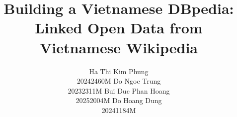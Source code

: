 \newcommand{\fillin}[1]{\textcolor{red}{[#1]}}

\usepackage{tikz}
\usetikzlibrary{arrows.meta, calc, positioning, backgrounds, shapes.geometric}

\usepackage[colorlinks=true, allcolors=blue]{hyperref}

\title{Building a Vietnamese DBpedia:\\ Linked Open Data from Vietnamese Wikipedia}

\author{%
  Ha Thi Kim Phung \\ 20242460M
  \And
  Do Ngoc Trung \\ 20232311M
  \And
  Bui Duc Phan Hoang \\ 20252004M
  \And
  Do Hoang Dung \\ 20241184M
}

\makeatletter
\renewcommand{\@noticestring}{%
  Semantic Web course project, Topic~2: \emph{Build a DBpedia version for Vietnamese language}.
  Group~23, lecturer Dr.~Do Ba Lam. Hanoi University of Science and Technology, October 2026.%
}
\makeatother
